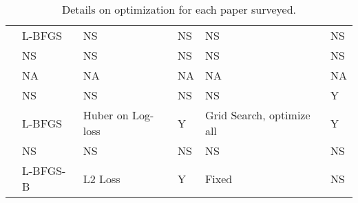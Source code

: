 \begin{table}[]
{\begin{tabular}{llllll}
\cite{jones2021scaling} & L-BFGS & NS & NS & NS & NS \\
\cite{zhai2022scaling} & NS & NS & NS & NS & NS \\
\cite{dettmers2023case} & NA & NA & NA & NA & NA \\
\cite{dubey2024llama} & NS & NS & NS & NS & Y \\
\cite{hoffmann2022training} & L-BFGS & Huber on Log-loss & Y & Grid Search, optimize all & Y \\
\cite{ardalani2022understanding} & NS & NS & NS & NS & NS \\
\cite{clark2022unified} & L-BFGS-B & L2 Loss & Y & Fixed & NS \\
\bottomrule
\end{tabular}

}

\caption{Details on optimization for each paper surveyed.}
\label{tab:full-opt}
\end{table}